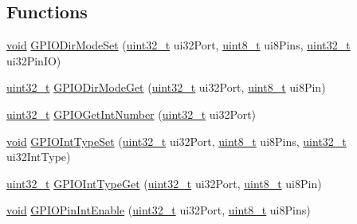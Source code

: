 \subsection*{Functions}
\begin{DoxyCompactItemize}
\item 
\hyperlink{usb__devapi_8h_afabf60e7f57651d6d595a02c75f07cd0}{void} \hyperlink{group__gpio__api_ga18dc54943796485c7298abd8fdcdcec3}{G\+P\+I\+O\+Dir\+Mode\+Set} (\hyperlink{_p_e___types_8h_a33594304e786b158f3fb30289278f5af}{uint32\+\_\+t} ui32\+Port, \hyperlink{_p_e___types_8h_aba7bc1797add20fe3efdf37ced1182c5}{uint8\+\_\+t} ui8\+Pins, \hyperlink{_p_e___types_8h_a33594304e786b158f3fb30289278f5af}{uint32\+\_\+t} ui32\+Pin\+IO)
\item 
\hyperlink{_p_e___types_8h_a33594304e786b158f3fb30289278f5af}{uint32\+\_\+t} \hyperlink{group__gpio__api_ga6f2d57e3e4d64c9ecbebc8cc4db2b3e1}{G\+P\+I\+O\+Dir\+Mode\+Get} (\hyperlink{_p_e___types_8h_a33594304e786b158f3fb30289278f5af}{uint32\+\_\+t} ui32\+Port, \hyperlink{_p_e___types_8h_aba7bc1797add20fe3efdf37ced1182c5}{uint8\+\_\+t} ui8\+Pin)
\item 
\hyperlink{_p_e___types_8h_a33594304e786b158f3fb30289278f5af}{uint32\+\_\+t} \hyperlink{group__gpio__api_ga0c72ea37e36a26a982bfe2587fc2ce40}{G\+P\+I\+O\+Get\+Int\+Number} (\hyperlink{_p_e___types_8h_a33594304e786b158f3fb30289278f5af}{uint32\+\_\+t} ui32\+Port)
\item 
\hyperlink{usb__devapi_8h_afabf60e7f57651d6d595a02c75f07cd0}{void} \hyperlink{group__gpio__api_gad98083fe7f4ce6c4e7daf004768dec1d}{G\+P\+I\+O\+Int\+Type\+Set} (\hyperlink{_p_e___types_8h_a33594304e786b158f3fb30289278f5af}{uint32\+\_\+t} ui32\+Port, \hyperlink{_p_e___types_8h_aba7bc1797add20fe3efdf37ced1182c5}{uint8\+\_\+t} ui8\+Pins, \hyperlink{_p_e___types_8h_a33594304e786b158f3fb30289278f5af}{uint32\+\_\+t} ui32\+Int\+Type)
\item 
\hyperlink{_p_e___types_8h_a33594304e786b158f3fb30289278f5af}{uint32\+\_\+t} \hyperlink{group__gpio__api_gab18d79b27894a1cfb22a1cf21061934a}{G\+P\+I\+O\+Int\+Type\+Get} (\hyperlink{_p_e___types_8h_a33594304e786b158f3fb30289278f5af}{uint32\+\_\+t} ui32\+Port, \hyperlink{_p_e___types_8h_aba7bc1797add20fe3efdf37ced1182c5}{uint8\+\_\+t} ui8\+Pin)
\item 
\hyperlink{usb__devapi_8h_afabf60e7f57651d6d595a02c75f07cd0}{void} \hyperlink{group__gpio__api_ga832dcfabffa2c2f81d8c9e0fc7a8eddb}{G\+P\+I\+O\+Pin\+Int\+Enable} (\hyperlink{_p_e___types_8h_a33594304e786b158f3fb30289278f5af}{uint32\+\_\+t} ui32\+Port, \hyperlink{_p_e___types_8h_aba7bc1797add20fe3efdf37ced1182c5}{uint8\+\_\+t} ui8\+Pins)

\end{DoxyCompactItemize}
